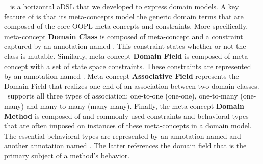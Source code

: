 ~\cite{le_domain_2018} is a horizontal aDSL that we developed to express domain models.
A key feature of  is that its meta-concepts model the generic domain terms that are composed of the core OOPL meta-concepts and constraints. More specifically, meta-concept \textbf{Domain Class} is composed of meta-concept  and a constraint captured by an annotation named . This constraint states whether or not the class is mutable. Similarly, meta-concept \textbf{Domain Field} is composed of meta-concept  with a set of state space constraints. 
These constraints are represented by an annotation named . 
Meta-concept \textbf{Associative Field} represents the Domain Field that realizes one end of an association between two domain classes. \dcsl~supports all three types of association: one-to-one (\abbr one-one), one-to-many (\abbr one-many) and many-to-many (\abbr many-many). 
Finally, the meta-concept \textbf{Domain Method} is composed of  and commonly-used constraints and behavioral types that are often imposed on instances of these meta-concepts in a domain model. The essential behavioral types are represented by an annotation named  and another annotation named . The latter references the domain field that is the primary subject of a method's behavior.



